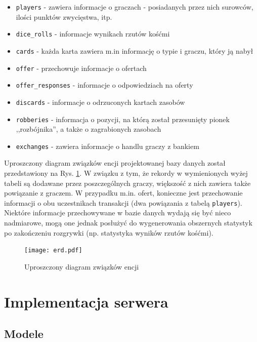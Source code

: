 \documentclass[a4paper,12pt]{article}
\providecommand{\imref}[1]{Rys. \ref{#1}} %
\begin{document}
\begin{itemize}
\item \texttt{players} - zawiera informacje o graczach -
  posiadanych przez nich surowców, ilości punktów zwycięstwa, itp.
\item \texttt{dice\_rolls} - informacje wynikach rzutów
  kośćmi
\item \texttt{cards} - każda karta zawiera m.in informację o typie i
  graczu, który ją nabył
\item \texttt{offer} - przechowuje informacje o ofertach
\item \texttt{offer\_responses} - informacje o odpowiedziach na oferty
\item \texttt{discards} - informacje o odrzuconych kartach zasobów
\item \texttt{robberies} - informacja o pozycji, na którą został
  przesunięty pionek ,,rozbójnika'', a także o zagrabionych zasobach
\item \texttt{exchanges} - zawiera informacje o handlu graczy z
  bankiem
\end{itemize}

Uproszczony diagram związków encji projektowanej bazy danych został
przedstawiony na \imref{erd}. W związku z tym, że rekordy w
wymienionych wyżej tabeli są dodawane przez poszczególnych graczy,
większość z nich zawiera także powiązanie z graczem. W przypadku
m.in. ofert, konieczne jest przechowanie informacji o obu uczestnikach
transakcji (dwa powiązania z tabelą \texttt{players}). Niektóre
informacje przechowywane w bazie danych wydają się być nieco
nadmiarowe, mogą one jednak posłużyć do wygenerowania obszernych
statystyk po zakończeniu rozgrywki (np. statystyka wyników rzutów
kośćmi).

\begin{figure}[ht]
  \begin{center}
    \texttt{[image: erd.pdf]}
  \end{center}
  \caption{Uproszczony diagram związków encji}
  \label{erd}
\end{figure}

\clearpage

\section{Implementacja serwera}

\subsection{Modele}\label{sec:models}
\end{document}
